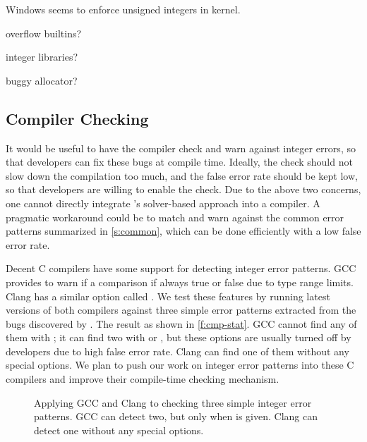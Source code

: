 Windows seems to enforce unsigned integers in kernel.

overflow builtins?

integer libraries?

buggy allocator?


\subsection{Compiler Checking}

It would be useful to have the compiler check and warn against
integer errors, so that developers can fix these bugs
at compile time.  Ideally, the check should not slow down
the compilation too much, and the false error rate should be kept low,
so that developers are willing to enable the check.
%
Due to the above two concerns, one cannot directly integrate
\sys's solver-based approach into a compiler.  A pragmatic workaround
could be to match and warn against the common error patterns
summarized in \autoref{s:common}, which can be done efficiently
with a low false error rate.

Decent C compilers have some support for detecting integer error
patterns.
%
GCC provides  to warn if a comparison if always
true or false due to type range limits.
%
Clang has a similar option called .
%
We test these features by running latest versions of both compilers
against three simple error patterns extracted from the bugs discovered
by \sys.  The result as shown in \autoref{f:cmp-stat}.  GCC cannot
find any of them with ; it can find two with 
or , but these options are usually turned off by
developers due to high false error rate.  Clang can find one of them
without any special options.
%
%
We plan to push our work on integer error patterns into these C
compilers and improve their compile-time checking mechanism.

\begin{figure}
\centering

\caption{Applying GCC and Clang to checking three simple integer
error patterns.  GCC can detect two, but only when  is
given.  Clang can detect one without any special options.}
\label{f:cmp-stat}
\end{figure}

